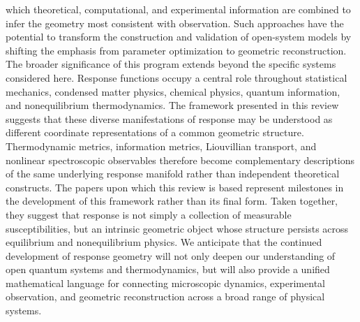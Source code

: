 which theoretical, computational, and experimental information
are combined to infer the geometry most consistent with
observation. Such approaches have the potential to transform the
construction and validation of open-system models by shifting the
emphasis from parameter optimization to geometric
reconstruction.
The broader significance of this program extends beyond the
specific systems considered here. Response functions occupy a
central role throughout statistical mechanics, condensed matter
physics, chemical physics, quantum information, and nonequilibrium
thermodynamics. The framework presented in this review suggests
that these diverse manifestations of response may be understood
as different coordinate representations of a common geometric
structure. Thermodynamic metrics, information metrics,
Liouvillian transport, and nonlinear spectroscopic observables
therefore become complementary descriptions of the same
underlying response manifold rather than independent theoretical
constructs.
The papers upon which this review is based represent milestones
in the development of this framework rather than its final form.
Taken together, they suggest that response is not simply a
collection of measurable susceptibilities, but an intrinsic
geometric object whose structure persists across equilibrium and
nonequilibrium physics. We anticipate that the continued
development of response geometry will not only deepen our
understanding of open quantum systems and thermodynamics, but
will also provide a unified mathematical language for connecting
microscopic dynamics, experimental observation, and geometric
reconstruction across a broad range of physical systems.


